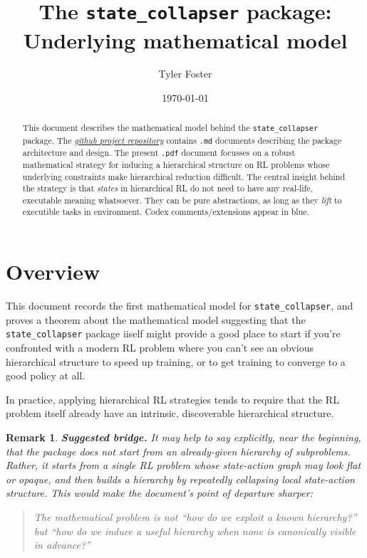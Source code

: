 \documentclass[11pt]{article}
\title{The \texttt{state\_collapser} package:\\ {Underlying mathematical model}}
\author{Tyler Foster}
\date{\today}
\newtheorem{remark}{Remark}[subsection]
\begin{document}
\maketitle

\begin{abstract}
This document describes the mathematical model behind the \texttt{state\_collapser} package. The \href{https://github.com/TYLERSFOSTER/state_collapser}{{\em github project repository}} contains \texttt{.md} documents describing the package architecture and design. The present \texttt{.pdf} document focusses on a robust mathematical strategy for inducing a hierarchical structure on RL problems whose underlying constraints make hierarchical reduction difficult. The central insight behind the strategy is that {\em states} in hierarchical RL do not need to have any real-life, executable meaning whatsoever. They can be pure abstractions, as long as they {\em lift} to executible tasks in environment.
{\color{blue} Codex comments/extensions appear in blue.}
\end{abstract}


\setcounter{tocdepth}{2}
\tableofcontents

\section{Overview}

This document records the first mathematical model for \texttt{state\_collapser}, and proves a theorem about the mathematical model suggesting that the \texttt{state\_collapser} package iiself might provide a good place to start if you're confronted with a modern RL problem where you can't see an obvious hierarchical structure to speed up training, or to get training to converge to a good policy at all.

In practice, applying hierarchical RL strategies tends to require that the RL problem itself already have an intrinsic, discoverable hierarchical structure.

{\color{blue}
\begin{remark}
{\bf Suggested bridge.}
\normalfont
It may help to say explicitly, near the beginning, that the package does {\em not} start from an already-given hierarchy of subproblems. Rather, it starts from a single RL problem whose state-action graph may look flat or opaque, and then builds a hierarchy by repeatedly collapsing local state-action structure. This would make the document's point of departure sharper:
\begin{center}
\begin{minipage}{0.85\textwidth}
\begin{quote}
The mathematical problem is not ``how do we exploit a known hierarchy?'' but ``how do we induce a useful hierarchy when none is canonically visible in advance?''
\end{quote}
\end{minipage}
\end{center}
\end{remark}
}
\end{document}
